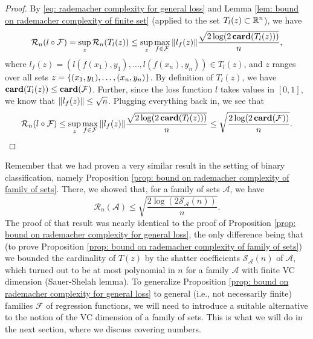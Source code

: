 \begin{proof}
By \eqref{eq: rademacher complexity for general loss} and Lemma \ref{lem: bound on rademacher complexity of finite set} (applied to the set $T_l(z) \subset \mathbb{R}^n$), we have
\[
    \mathcal{R}_n(l \circ \mathcal{F}) = \sup_z \mathcal{R}_n(T_l(z)) \leq \sup_z \max_{f \in \mathcal{F}} \norm{l_f(z)} \frac{\sqrt{2 \log(2 \, \mathrm{\mathbf{card}}(T_l(z)))}}{n},
\]
where $l_f(z) = ( l(f(x_1), y_1), \dots, l(f(x_n), y_n) ) \in T_l(z)$, and $z$ ranges over all sets $z = \left\{(x_1, y_1), \dots, (x_n, y_n)\right\}$. By definition of $T_l(z)$, we have $\mathrm{\mathbf{card}}(T_l(z)) \leq \mathrm{\mathbf{card}}(\mathcal{F})$. Further, since the loss function $l$ takes values in $[0, 1]$, we know that $\norm{l_f(z)} \leq \sqrt{n}$. Plugging everything back in, we see that
\[
    \mathcal{R}_n(l \circ \mathcal{F}) \leq \sup_z \max_{f \in \mathcal{F}} \norm{l_f(z)} \frac{\sqrt{2 \log(2 \, \mathrm{\mathbf{card}}(T_l(z)))}}{n} \leq \sqrt{\frac{2 \log(2 \, \mathrm{\mathbf{card}}(\mathcal{F}))}{n}}.
\]
\end{proof}

Remember that we had proven a very similar result in the setting of binary classification, namely Proposition \ref{prop: bound on rademacher complexity of family of sets}. There, we showed that, for a family of sets $\mathcal{A}$, we have
\[
    \mathcal{R}_n(\mathcal{A}) \leq \sqrt{\frac{2 \log(2 \mathcal{S}_{\mathcal{A}}(n))}{n}}.
\]
The proof of that result was nearly identical to the proof of Proposition \ref{prop: bound on rademacher complexity for general loss}, the only difference being that (to prove Proposition \ref{prop: bound on rademacher complexity of family of sets}) we bounded the cardinality of $T(z)$ by the shatter coefficients $\mathcal{S}_{\mathcal{A}}(n)$ of $\mathcal{A}$, which turned out to be at most polynomial in $n$ for a family $\mathcal{A}$ with finite VC dimension (Sauer-Shelah lemma). To generalize Proposition \ref{prop: bound on rademacher complexity for general loss} to general (i.e., not necessarily finite) families $\mathcal{F}$ of regression functions, we will need to introduce a suitable alternative to the notion of the VC dimension of a family of sets. This is what we will do in the next section, where we discuss covering numbers.
